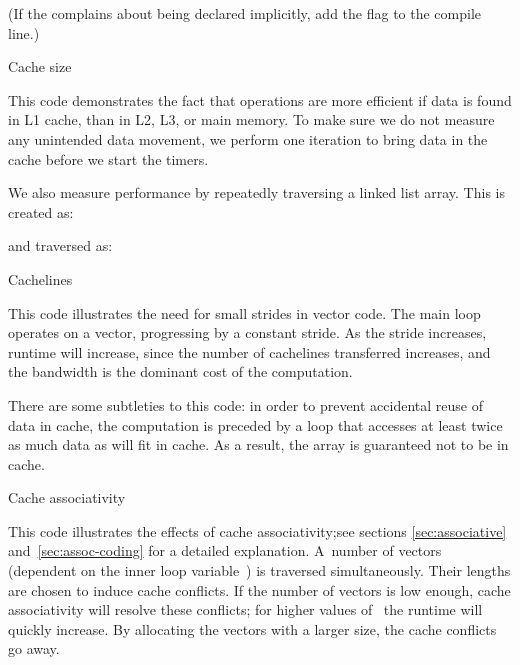(If the  complains about
 being declared implicitly, add the 
flag to the compile line.)

 {Cache size}
\label{sec:cachesize-code}

This code demonstrates the fact that operations are more efficient if
data is found in L1 cache, than in L2, L3, or main memory. To make
sure we do not measure any unintended data movement, we perform one
iteration to bring data in the cache before we start the timers.


We also measure performance by repeatedly traversing a linked list array.
This is created as:
%

and traversed as:
%

 {Cachelines}
\label{sec:cacheline-code}

This code illustrates the need for small strides in vector code. The
main loop operates on a vector, progressing by a constant stride. As
the stride increases, runtime will increase, since the number of
cachelines transferred increases, and the bandwidth is the dominant
cost of the computation.

There are some subtleties to this code: in order to prevent accidental
reuse of data in cache, the computation is preceded by a loop that
accesses at least twice as much data as will fit in cache. As a
result, the array is guaranteed not to be in cache.

{}

 {Cache associativity}
\label{sec:assoc-code}

This code illustrates the effects of cache associativity;see sections
\ref{sec:associative} and~\ref{sec:assoc-coding} for a detailed
explanation. A~number of vectors (dependent on the inner loop
variable~) is traversed simultaneously.  Their lengths are
chosen to induce cache conflicts. If the number of vectors is low
enough, cache associativity will resolve these conflicts; for higher
values of~ the runtime will quickly increase. By allocating the
vectors with a larger size, the cache conflicts go away.


